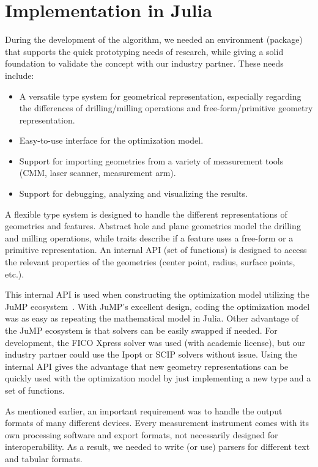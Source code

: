 \documentclass{juliacon}
\begin{document}
\section{Implementation in Julia}
\label{sec:approach}

During the development of the algorithm, we needed an environment (package) that supports the quick prototyping needs of research, while giving a solid foundation to validate the concept with our industry partner.
These needs include:

\begin{itemize}
	\item A versatile type system for geometrical representation, especially regarding the differences of drilling/milling operations and free-form/primitive geometry representation.
	\item Easy-to-use interface for the optimization model.
	\item Support for importing geometries from a variety of measurement tools (CMM, laser scanner, measurement arm).
	\item Support for debugging, analyzing and visualizing the results.
\end{itemize}

A flexible type system is designed to handle the different representations of geometries and features.
Abstract hole and plane geometries model the drilling and milling operations, while traits describe if a feature uses a free-form or a primitive representation.
An internal API (set of functions) is designed to access the relevant properties of the geometries (center point, radius, surface points, etc.).

This internal API is used when constructing the optimization model utilizing the JuMP ecosystem~\cite{Lubin2023}.
With JuMP's excellent design, coding the optimization model was as easy as repeating the mathematical model in Julia.
Other advantage of the JuMP ecosystem is that solvers can be easily swapped if needed.
For development, the FICO Xpress solver was used (with academic license), but our industry partner could use the Ipopt or SCIP solvers without issue.
Using the internal API gives the advantage that new geometry representations can be quickly used with the optimization model by just implementing a new type and a set of functions.

As mentioned earlier, an important requirement was to handle the output formats of many different devices.
Every measurement instrument comes with its own processing software and export formats, not necessarily designed for interoperability.
As a result, we needed to write (or use) parsers for different text and tabular formats.
\end{document}
